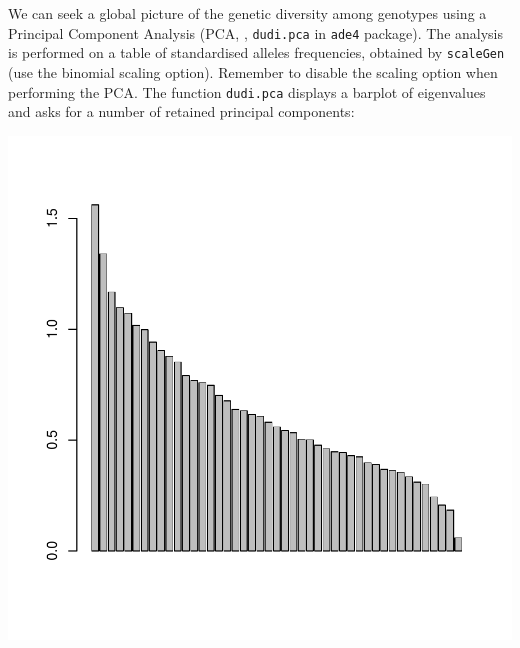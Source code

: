 \documentclass{article}
\begin{document}
We can seek a global picture of the genetic diversity among genotypes
using a Principal Component Analysis (PCA, \cite{tj383,np137}, \texttt{dudi.pca} in \texttt{ade4}
package).
The analysis is performed on a table of standardised alleles
frequencies, obtained by \texttt{scaleGen} (use the binomial scaling option).
Remember to disable the scaling option when performing the PCA.
The function \texttt{dudi.pca} displays a barplot of
eigenvalues and asks for a number of retained principal components:
\begin{Schunk}
\end{Schunk}
\includegraphics{figs/spca-027}
\end{document}
